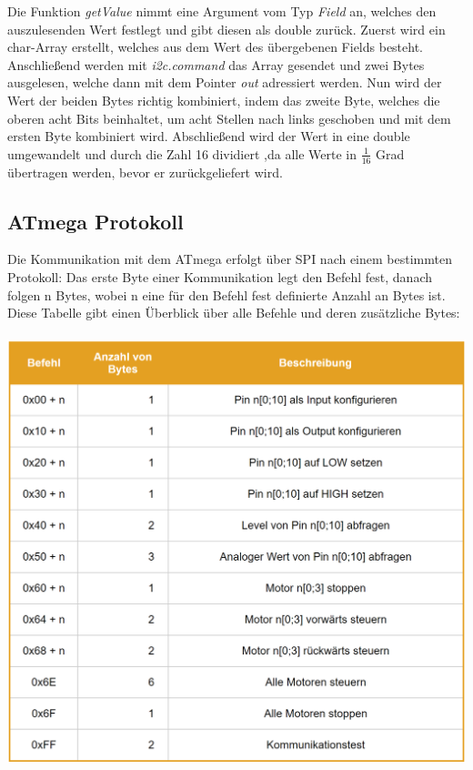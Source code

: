 \documentclass[12pt]{article}
\begin{document}
\vspace{-2mm}
Die Funktion \textit{getValue} nimmt eine Argument vom Typ \textit{Field} an, welches den auszulesenden Wert festlegt und gibt diesen als double zurück. Zuerst wird ein char-Array erstellt, welches aus dem Wert des übergebenen Fields besteht. Anschließend werden mit \textit{i2c.command} das Array gesendet und zwei Bytes ausgelesen, welche dann mit dem Pointer \textit{out} adressiert werden. Nun wird der Wert der beiden Bytes richtig kombiniert, indem das zweite Byte, welches die oberen acht Bits beinhaltet, um acht Stellen nach links geschoben und mit dem ersten Byte kombiniert wird. Abschließend wird der Wert in eine double umgewandelt und durch die Zahl 16 dividiert ,da alle Werte in $\frac{1}{16}$ Grad übertragen werden, bevor er zurückgeliefert wird.
\subsection{ATmega Protokoll}
Die Kommunikation mit dem ATmega erfolgt über SPI nach einem bestimmten Protokoll: Das erste Byte einer Kommunikation legt den Befehl fest, danach folgen n Bytes, wobei n eine für den Befehl fest definierte Anzahl an Bytes ist. Diese Tabelle gibt einen Überblick über alle Befehle und deren zusätzliche Bytes:\\\\
\includegraphics[width=\textwidth]{img/commands.PNG}
\begin{center}\end{center}
\end{document}
